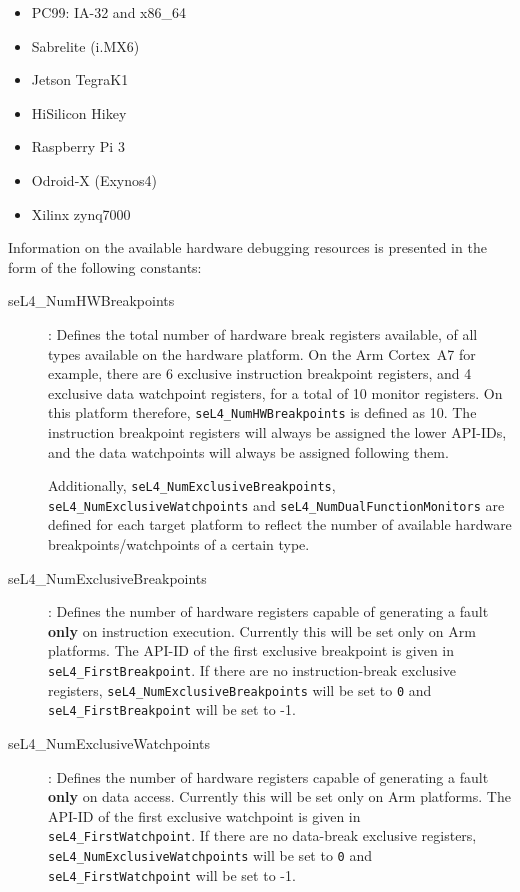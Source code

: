\begin{itemize}
\item PC99: IA-32 and x86\_64
\item Sabrelite (i.MX6)
\item Jetson TegraK1
\item HiSilicon Hikey
\item Raspberry Pi 3
\item Odroid-X (Exynos4)
\item Xilinx zynq7000
\end{itemize}

Information on the available hardware debugging resources is presented in the form of the following constants:

\begin{description}
\item[seL4\_NumHWBreakpoints]: Defines the total number of hardware break
registers available, of all types available on the hardware platform. On the Arm
Cortex~A7 for example, there are 6 exclusive instruction breakpoint registers,
and 4 exclusive data watchpoint registers, for a total of 10 monitor registers.
On this platform therefore, \texttt{seL4\_NumHWBreakpoints} is defined as 10.
The instruction breakpoint registers will always be assigned the lower API-IDs,
and the data watchpoints will always be assigned following them.

Additionally, \texttt{seL4\_NumExclusiveBreakpoints}, \texttt{seL4\_NumExclusiveWatchpoints}
and \texttt{seL4\_NumDualFunctionMonitors}
are defined for each target platform to reflect the number of available
hardware breakpoints/watchpoints of a certain type.

\item[seL4\_NumExclusiveBreakpoints]: Defines the number of hardware registers
capable of generating a fault \textbf{only} on instruction execution. Currently this will be
set only on Arm platforms. The API-ID of the first exclusive breakpoint is given
in \texttt{seL4\_FirstBreakpoint}. If there are no instruction-break exclusive
registers, \texttt{seL4\_NumExclusiveBreakpoints} will be set to \texttt{0} and
\texttt{seL4\_FirstBreakpoint} will be set to -1.

\item[seL4\_NumExclusiveWatchpoints]: Defines the number of hardware registers
capable of generating a fault \textbf{only} on data access. Currently this will be set only
on Arm platforms. The API-ID of the first exclusive watchpoint is given
in \texttt{seL4\_FirstWatchpoint}. If there are no data-break exclusive
registers, \texttt{seL4\_NumExclusiveWatchpoints} will be set to \texttt{0} and
\texttt{seL4\_FirstWatchpoint} will be set to -1.


\end{description}
